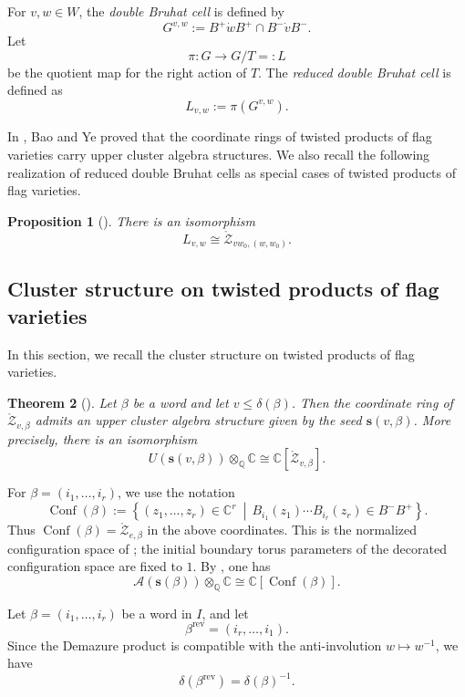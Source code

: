 \documentclass[12pt, reqno]{amsart}
\theoremstyle{plain}
\newtheorem{theorem}{Theorem}[section]
\newtheorem{proposition}[theorem]{Proposition}
\theoremstyle{definition}
\numberwithin{equation}{section}
\begin{document}
For \(v,w\in W\), the \emph{double Bruhat cell} is defined by
\[
G^{v,w}:=B^+\dot wB^+\cap B^-\dot vB^-.
\]
Let
\[
\pi:G\to G/T=:L
\]
be the quotient map for the right action of \(T\). The \emph{reduced double
Bruhat cell} is defined as
\[
L_{v,w}:=\pi(G^{v,w}).
\]

In \cite{bao2025upper}, Bao and Ye proved that the coordinate rings of twisted
products of flag varieties carry upper cluster algebra structures. We also
recall the following realization of reduced double Bruhat cells as special
cases of twisted products of flag varieties.

\begin{proposition}[{\cite[Proposition~2.1]{webster2007deodhar}}]
There is an isomorphism
\[
L_{v,w}\cong \mathring{\mathcal{Z}}_{v w_0,(w,w_0)}.
\]
\end{proposition}

\subsection{Cluster structure on twisted products of flag varieties}

In this section, we recall the cluster structure on twisted products of flag
varieties.

\begin{theorem}[{\cite[Theorem~6.5 and Remark~6.1]{bao2025upper}}]
Let \(\beta\) be a word and let \(v\le \delta(\beta)\). Then the coordinate
ring of \(\mathring{\mathcal{Z}}_{v,\beta}\) admits an upper cluster algebra
structure given by the seed \(\mathbf{s}(v,\beta)\). More precisely, there is
an isomorphism
\[
U(\mathbf{s}(v,\beta))\otimes_{\mathbb Q}\mathbb C
\cong
\mathbb C[\mathring{\mathcal{Z}}_{v,\beta}].
\]
\end{theorem}

For \(\beta=(i_1,\ldots,i_r)\), we use the notation
\[
\operatorname{Conf}(\beta)
:=
\left\{(z_1,\ldots,z_r)\in\mathbb C^r\ \middle|\,
B_{i_1}(z_1)\cdots B_{i_r}(z_r)\in B^-B^+\right\}.
\]
Thus \(\operatorname{Conf}(\beta)=\mathring{\mathcal Z}_{e,\beta}\)
in the above coordinates. This is the normalized configuration space
of \cite[Section~3.7]{casals2025cluster}; the initial boundary torus
parameters of the decorated configuration space are fixed to \(1\).
By \cite[Corollary~5.21]{casals2025cluster}, one has
\[
\mathcal A(\mathbf{s}(\beta))\otimes_{\mathbb Q}\mathbb C
\cong
\mathbb C[\operatorname{Conf}(\beta)].
\]

Let \(\beta=(i_1,\dots,i_r)\) be a word in \(I\), and let
\[
\beta^{\operatorname{rev}}=(i_r,\dots,i_1).
\]
Since the Demazure product is compatible with the anti-involution
\(w\mapsto w^{-1}\), we have
\[
\delta(\beta^{\operatorname{rev}})
=
\delta(\beta)^{-1}.
\]
\end{document}
